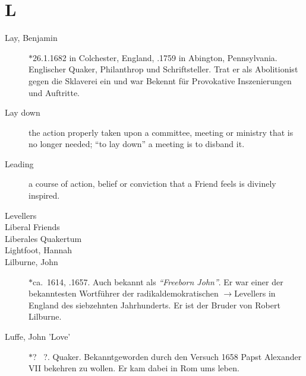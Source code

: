 \section*{L}

\articlesize

\begin{description}

 \item[Lay, Benjamin] $\ast$26.1.1682 in Colchester, England, .1759 in
 Abington, Pennsylvania. Englischer Quaker, Philanthrop und Schriftsteller.
 Trat er als Abolitionist gegen die Sklaverei ein und war Bekennt für
 Provokative Inszenierungen und Auftritte.

 \item[Lay down]
    the action properly taken upon a committee, meeting or ministry that is no longer needed; "`to lay down"' a meeting is to disband it.

 \item[Leading]
    a course of action, belief or conviction that a Friend feels is divinely inspired.

 \item[Levellers]

 \item[Liberal Friends]

 \item[Liberales Quakertum]

 \item[Lightfoot, Hannah]

 \item[Lilburne, John] $\ast$ca.~1614, .1657. Auch bekannt als
 \textit{"`Freeborn John"'}. Er war einer der bekanntesten Wortführer der
 radikaldemokratischen $\to$Levellers in England des siebzehnten Jahrhunderts.
 Er ist der Bruder von Robert Lilburne.

 \item[Luffe, John 'Love'] $\ast$? \dag~?. Quaker. Bekanntgeworden durch den
 Versuch 1658 Papst Alexander VII bekehren zu wollen. Er kam dabei in Rom ums
 leben.

 \end{description}
\normalsize
